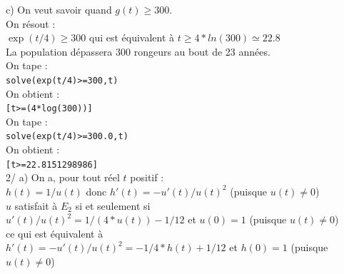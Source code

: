 \documentclass[a4paper,11pt]{book}
\begin{document}
c) On veut savoir quand $g(t)\geq 300$.\\
 On r\'esout :\\
$\exp(t/4)\geq 300$ qui est \'equivalent \`a $t \geq 4*ln(300)\simeq 22.8$\\
La population d\'epassera 300 rongeurs au bout de 23 ann\'ees.\\
On tape :\\
{\tt solve(exp(t/4)>=300,t)}\\
On obtient :\\
{\tt [t>=(4*log(300))]}\\
On tape :\\
{\tt solve(exp(t/4)>=300.0,t)}\\
On obtient :\\
{\tt [t>=22.8151298986]}\\

2/ a) On a,  pour tout r\'eel $t$ positif :\\
$h(t)=1/u(t)$ donc $h'(t)=-u'(t)/u(t)^2$ (puisque $u(t)\neq 0$)\\
$u$ satisfait \`a $E_2$ si et seulement si\\
$u'(t)/u(t)^2=1/(4*u(t))-1/12$ et $u(0)=1$ (puisque $u(t)\neq 0$)\\
ce qui est \'equivalent \`a \\
$h'(t)=-u'(t)/u(t)^2=-1/4*h(t)+1/12$ et $h(0)=1$ (puisque $u(t)\neq 0$)
\end{document}
